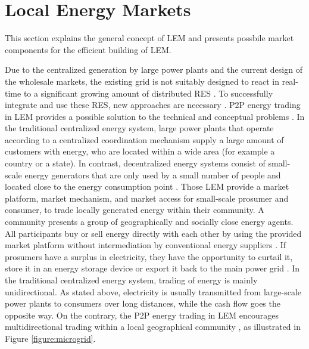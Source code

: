\section{Local Energy Markets}
\label{sec:lem}
This section explains the general concept of LEM
and presents possbile market components for the efficient building of LEM.

Due to the centralized generation by large power plants
and the current design of the wholesale markets, the existing grid is not suitably designed
to react in real-time to a significant growing 
amount of distributed RES .
To successfully integrate and use these RES, new approaches are necessary .
P2P energy trading in LEM provides a possible solution to the technical and conceptual problems .
In the traditional centralized energy system, large power plants that operate according to a
centralized coordination mechanism supply a large amount of customers with energy, who are located 
within a wide area (for example a country or a state).
In contrast, decentralized energy systems consist of small-scale energy generators that are 
only used by a small number of people and located close to the energy consumption point .
Those LEM provide a market platform, market mechanism, and market access
for small-scale prosumer and consumer, to trade locally generated energy within their community.
A community presents a group of geographically and socially close energy agents.
All participants buy or sell energy directly with each other by using the provided market platform
without intermediation by conventional energy suppliers .
If prosumers have a surplus in electricity, they have the opportunity 
to curtail it, store it in an energy storage device or export it back to the main power grid .
In the traditional centralized energy system, trading of energy is mainly unidirectional.
As stated above, electricity is usually transmitted from large-scale power plants to 
consumers over long distances, while the cash flow goes the opposite way. 
On the contrary, the P2P energy trading in LEM encourages multidirectional trading within 
a local geographical community , as illustrated in Figure \ref{figure:microgrid}.

